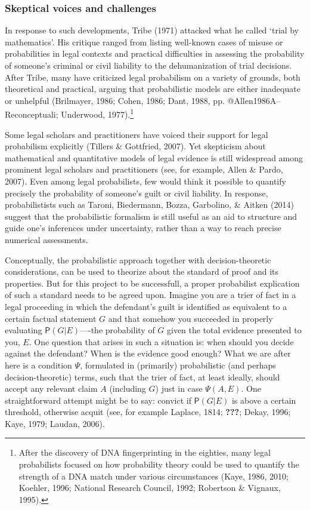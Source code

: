 \documentclass[11pt,dvipsnames,enabledeprecatedfontcommands]{scrartcl}
\newcommand{\pr}[1]{\mathsf{P}(#1)}
\begin{document}
\hypertarget{skeptical-voices-and-challenges}{%
\subsubsection{Skeptical voices and
challenges}\label{skeptical-voices-and-challenges}}

In response to such developments, Tribe (1971) attacked what he called
`trial by mathematics'. His critique ranged from listing well-known
cases of misuse or probabilities in legal contexts and practical
difficulties in assessing the probability of someone's criminal or civil
liability to the dehumanization of trial decisions. After Tribe, many
have criticized legal probabilism on a variety of grounds, both
theoretical and practical, arguing that probabilistic models are either
inadequate or unhelpful (Brilmayer, 1986; Cohen, 1986; Dant, 1988, pp.
@Allen1986A--Reconceptuali; Underwood, 1977).\footnote{After the
  discovery of DNA fingerprinting in the eighties, many legal
  probabilists focused on how probability theory could be used to
  quantify the strength of a DNA match under various circumstances
  (Kaye, 1986, 2010; Koehler, 1996; National Research Council, 1992;
  Robertson \& Vignaux, 1995).}

Some legal scholars and practitioners have voiced their support for
legal probabilism explicitly (Tillers \& Gottfried, 2007). Yet
skepticism about mathematical and quantitative models of legal evidence
is still widespread among prominent legal scholars and practitioners
(see, for example, Allen \& Pardo, 2007). Even among legal probabilists,
few would think it possible to quantify precisely the probability of
someone's guilt or civil liability. In response, probabilistists such as
Taroni, Biedermann, Bozza, Garbolino, \& Aitken (2014) suggest that the
probabilistic formalism is still useful as an aid to structure and guide
one's inferences under uncertainty, rather than a way to reach precise
numerical assessments.

Conceptually, the probabilistic approach together with
decision-theoretic considerations, can be used to theorize about the
standard of proof and its properties. But for this project to be
successfull, a proper probabilist explication of such a standard needs
to be agreed upon. Imagine you are a trier of fact in a legal proceeding
in which the defendant's guilt is identified as equivalent to a certain
factual statement \(G\) and that somehow you succeeded in properly
evaluating \(\pr{G\vert E}\)----the probability of \(G\) given the total
evidence presented to you, \(E\). One question that arises in such a
situation is: when should you decide against the defendant? When is the
evidence good enough? What we are after here is a condition \(\Psi\),
formulated in (primarily) probabilistic (and perhaps decision-theoretic)
terms, such that the trier of fact, at least ideally, should accept any
relevant claim \(A\) (including \(G\)) just in case \(\Psi(A, E)\). One
straightforward attempt might be to say: convict if \(\pr{G\vert E}\) is
above a certain threshold, otherwise acquit (see, for example Laplace,
1814; {\textbf{???}}; Dekay, 1996; Kaye, 1979; Laudan, 2006).
\end{document}
